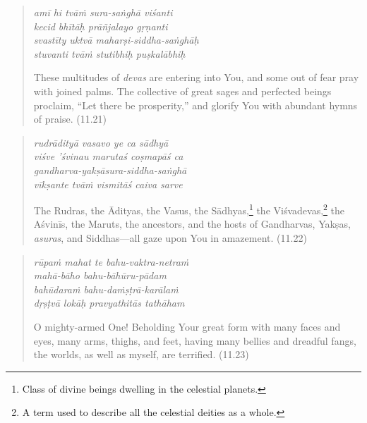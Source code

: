 \documentclass[12pt, twoside, openright]{memoir}
\begin{document}
\par
\begin{verse}
\textit{amī hi tvāṁ sura-saṅghā viśanti} \\
\textit{kecid bhītāḥ prāñjalayo gṛṇanti} \\
\textit{svastīty uktvā maharṣi-siddha-saṅghāḥ} \\
\textit{stuvanti tvāṁ stutibhiḥ puṣkalābhiḥ}

\noindent These multitudes of \textit{devas} are entering into You, and some out of fear pray with joined palms. The collective of great sages and perfected beings proclaim, \enquote{Let there be prosperity,} and glorify You with abundant hymns of praise. (11.21)
\end{verse}
\par



\par
\begin{verse}
\textit{rudrādityā vasavo ye ca sādhyā} \\
\textit{viśve ’śvinau marutaś coṣmapāś ca} \\
\textit{gandharva-yakṣāsura-siddha-saṅghā} \\
\textit{vīkṣante tvāṁ vismitāś caiva sarve}

\noindent The Rudras, the Ādityas, the Vasus, the Sādhyas,\footnote{Class of divine beings dwelling in the celestial planets.} the Viśvadevas,\footnote{A term used to describe all the celestial deities as a whole.} the Aśvinīs, the Maruts, the ancestors, and the hosts of Gandharvas, Yakṣas, \textit{asuras}, and Siddhas---all gaze upon You in amazement. (11.22)
\end{verse}
\par



\par
\begin{verse}
\textit{rūpaṁ mahat te bahu-vaktra-netraṁ} \\
\textit{mahā-bāho bahu-bāhūru-pādam} \\
\textit{bahūdaraṁ bahu-daṁṣṭrā-karālaṁ} \\
\textit{dṛṣṭvā lokāḥ pravyathitās tathāham}

\noindent O mighty-armed One! Beholding Your great form with many faces and eyes, many arms, thighs, and feet, having many bellies and dreadful fangs, the worlds, as well as myself, are terrified. (11.23)
\end{verse}
\par
\end{document}

